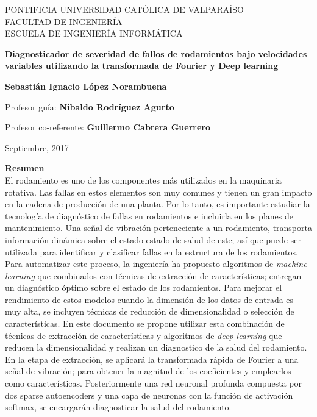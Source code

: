 \documentclass[12pt]{article}%
\begin{document}
\thispagestyle{empty}

\begin{center}
PONTIFICIA UNIVERSIDAD CATÓLICA DE VALPARAÍSO\\
FACULTAD DE INGENIERÍA\\
ESCUELA DE INGENIERÍA INFORMÁTICA\\

\vspace{4cm}

\Large{\textbf{Diagnosticador de severidad de fallos de rodamientos bajo velocidades variables utilizando la transformada de Fourier y Deep learning}}

\vspace{3cm}

\normalsize{\textbf{Sebastián Ignacio López Norambuena}}\\
\end{center}

\vspace{3cm}
\begin{center} 
Profesor guía: \textbf{Nibaldo Rodríguez Agurto}
\end{center}
\begin{center} 
Profesor co-referente: \textbf{Guillermo Cabrera Guerrero}
\end{center}
\vspace{1cm}
\begin{center} 
Septiembre, 2017
\end{center}
\newpage
{}

\noindent
\Large{\textbf{Resumen}}\\

\normalsize
\noindent El rodamiento es uno de los componentes más utilizados en la maquinaria rotativa. Las fallas en estos elementos son muy comunes y tienen un gran impacto en la cadena de producción de una planta. Por lo tanto, es importante estudiar la tecnología de diagnóstico de fallas en rodamientos e incluirla en los planes de mantenimiento. Una señal de vibración perteneciente a un rodamiento, transporta información dinámica sobre el estado estado de salud de este; así que puede ser utilizada para identificar y clasificar fallas en la estructura de los rodamientos. Para automatizar este proceso, la ingeniería ha propuesto algoritmos de \textit{machine learning} que combinados con técnicas de extracción de características; entregan un diagnóstico óptimo sobre el estado de los rodamientos. Para mejorar el rendimiento de estos modelos cuando la dimensión de los datos de entrada es muy alta, se incluyen técnicas de reducción de dimensionalidad o selección de características. En este documento se propone utilizar esta combinación de técnicas de extracción de características y algoritmos de \textit{deep learning} que reducen la dimensionalidad y realizan un diagnostico de la salud del rodamiento. En la etapa de extracción, se aplicará la transformada rápida de Fourier a una señal de vibración; para obtener la magnitud de los coeficientes y emplearlos como características. Posteriormente una red neuronal profunda compuesta por dos sparse autoencoders y una capa de neuronas con la función de activación softmax, se encargarán diagnosticar la salud del rodamiento.
\newline
\end{document}
